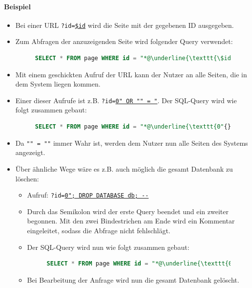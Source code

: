 \documentclass[a4paper, 11pt, accentcolor = tud3b]{tudreport}
\begin{document}
				\paragraph{Beispiel}
					\begin{itemize}
						\item Bei einer URL \texttt{?id=\underline{\$id}} wird die Seite mit der gegebenen ID ausgegeben.
						\item Zum Abfragen der anzuzeigenden Seite wird folgender Query verwendet:
							\begin{figure}[H]
								\centering
								\begin{lstlisting}[language = SQL]
SELECT * FROM page WHERE id = "*@\underline{\texttt{\$id}}@*";
\end{lstlisting}
							\end{figure}
						\item Mit einem geschickten Aufruf der URL kann der Nutzer an alle Seiten, die in dem System liegen kommen.
						\item Einer dieser Aufrufe ist z.B. \texttt{?id=}\underline{\texttt{0"{} OR {}"{}"{} = "}}. Der SQL-Query wird wie folgt zusammen gebaut:
							\begin{figure}[H]
								\begin{lstlisting}[language = SQL]
SELECT * FROM page WHERE id = "*@\underline{\texttt{0"{} OR {}"{}"{} = "}}@*";
\end{lstlisting}
							\end{figure}
						\item Da \texttt{"" = ""} immer Wahr ist, werden dem Nutzer nun alle Seiten des Systems angezeigt.
						\item Über ähnliche Wege wäre es z.B. auch möglich die gesamt Datenbank zu löschen:
							\begin{itemize}
								\item Aufruf: \texttt{?id=\underline{0"; DROP DATABASE db; -{}-}}
								\item Durch das Semikolon wird der erste Query beendet und ein zweiter begonnen. Mit den zwei Bindestrichen am Ende wird ein Kommentar eingeleitet, sodass die Abfrage nicht fehlschlägt.
								\item Der SQL-Query wird nun wie folgt zusammen gebaut:
									\begin{figure}[H]
										\begin{lstlisting}[language = SQL]
SELECT * FROM page WHERE id = "*@\underline{\texttt{0"; DROP DATABASE db; -{}-}}@*";
\end{lstlisting}
									\end{figure}
								\item Bei Bearbeitung der Anfrage wird nun die gesamt Datenbank gelöscht.
							\end{itemize}
					\end{itemize}
\end{document}

